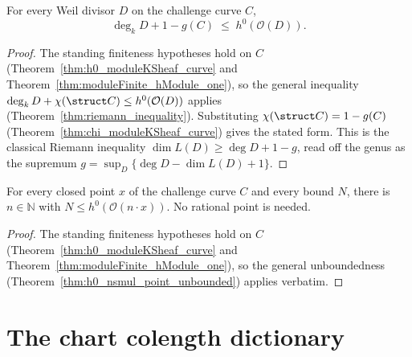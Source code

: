 \begin{theorem}
  \label{thm:riemann_inequality_curve}
  \leanok
  For every Weil divisor \(D\) on the challenge curve \(C\),
  \[
    \deg_k D + 1 - g(C) \;\le\; h^0(\mathcal O(D)).
  \]
\end{theorem}
\begin{proof}
  \leanok
  The standing finiteness hypotheses hold on \(C\) (Theorem~\ref{thm:h0_moduleKSheaf_curve} and
  Theorem~\ref{thm:moduleFinite_hModule_one}), so the general inequality
  \(\deg_k D + \chi(\struct C) \le h^0(\mathcal O(D))\) applies
  (Theorem~\ref{thm:riemann_inequality}). Substituting \(\chi(\struct C) = 1 - g(C)\)
  (Theorem~\ref{thm:chi_moduleKSheaf_curve}) gives the stated form. This is the classical Riemann
  inequality \(\dim L(D) \ge \deg D + 1 - g\), read off the genus as the supremum
  \(g = \sup_D\{\deg D - \dim L(D) + 1\}\).
\end{proof}

\begin{theorem}
  \label{thm:h0_nsmul_point_unbounded_curve}
  \leanok
  For every closed point \(x\) of the challenge curve \(C\) and every bound \(N\), there is
  \(n \in \mathbb N\) with \(N \le h^0(\mathcal O(n \cdot x))\). No rational point is needed.
\end{theorem}
\begin{proof}
  \leanok
  The standing finiteness hypotheses hold on \(C\) (Theorem~\ref{thm:h0_moduleKSheaf_curve} and
  Theorem~\ref{thm:moduleFinite_hModule_one}), so the general unboundedness
  (Theorem~\ref{thm:h0_nsmul_point_unbounded}) applies verbatim.
\end{proof}

\section{The chart colength dictionary}
\label{sec:chart_colength}


